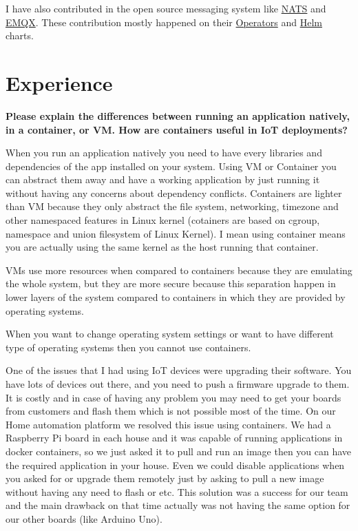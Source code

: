 I have also contributed in the open source messaging system like
\href{https://github.com/nats-io/}{NATS} and \href{https://github.com/emqx}{EMQX}.
These contribution mostly happened on their
\href{https://kubernetes.io/docs/concepts/extend-kubernetes/operator/}{Operators}
and \href{https://helm.sh/}{Helm} charts.

\section{Experience}

\noindent
\textbf{Please explain the differences between running an application natively, in a container, or VM.
How are containers useful in IoT deployments?}

When you run an application natively you need to have every libraries and dependencies of the app installed on your system.
Using VM or Container you can abstract them away and have a working application by just running it without
having any concerns about dependency conflicts.
Containers are lighter than VM because they only abstract the file system, networking, timezone and other namespaced
features in Linux kernel (cotainers are based on cgroup, namespace and union filesystem of Linux Kernel).
I mean using container means you are actually using the same kernel as the host running that container.

VMs use more resources when compared to containers because they are emulating the whole system,
but they are more secure because this separation happen in lower layers of the system compared
to containers in which they are provided by operating systems.

When you want to change operating system settings or want to have different type of operating systems then you cannot
use containers.

One of the issues that I had using IoT devices were upgrading their software.
You have lots of devices out there, and you need to push a firmware upgrade to them.
It is costly and in case of having any problem you may need to get your boards from customers and flash them
which is not possible most of the time.
On our Home automation platform we resolved this issue using containers. We had a Raspberry Pi board in each house
and it was capable of running applications in docker containers, so we just asked it to pull and run an image then
you can have the required application in your house. Even we could disable applications when you asked for or upgrade
them remotely just by asking to pull a new image without having any need to flash or etc.
This solution was a success for our team and the main drawback on that time actually was not having the same
option for our other boards (like Arduino Uno).

